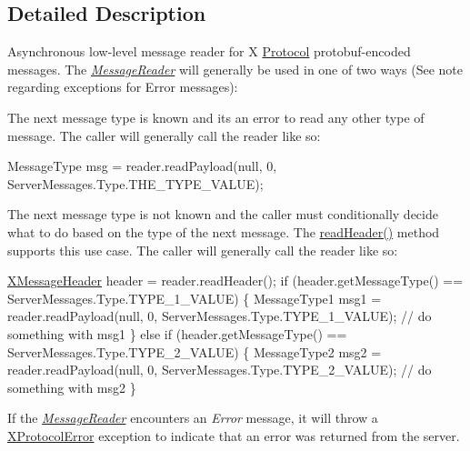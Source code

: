 \subsection{Detailed Description}
Asynchronous low-\/level message reader for X \mbox{\hyperlink{interfacecom_1_1mysql_1_1cj_1_1protocol_1_1_protocol}{Protocol}} protobuf-\/encoded messages. The {\itshape \mbox{\hyperlink{interfacecom_1_1mysql_1_1cj_1_1protocol_1_1_message_reader}{Message\+Reader}}} will generally be used in one of two ways (See note regarding exceptions for Error messages)\+: 
\begin{DoxyItemize}
\item The next message type is known and it\textquotesingle{}s an error to read any other type of message. The caller will generally call the reader like so\+:


\begin{DoxyPre}
MessageType msg = reader.readPayload(null, 0, ServerMessages.Type.THE\_TYPE\_VALUE);
\end{DoxyPre}



\item The next message type is not known and the caller must conditionally decide what to do based on the type of the next message. The \mbox{\hyperlink{classcom_1_1mysql_1_1cj_1_1protocol_1_1x_1_1_async_message_reader_a6c755b53680af84a699114422348db84}{read\+Header()}} method supports this use case. The caller will generally call the reader like so\+:


\begin{DoxyPre}
\mbox{\hyperlink{classcom_1_1mysql_1_1cj_1_1protocol_1_1x_1_1_x_message_header}{XMessageHeader}} header = reader.readHeader();
if (header.getMessageType() == ServerMessages.Type.TYPE\_1\_VALUE) \{
    MessageType1 msg1 = reader.readPayload(null, 0, ServerMessages.Type.TYPE\_1\_VALUE);
    // do something with msg1
\} else if (header.getMessageType() == ServerMessages.Type.TYPE\_2\_VALUE) \{
    MessageType2 msg2 = reader.readPayload(null, 0, ServerMessages.Type.TYPE\_2\_VALUE);
    // do something with msg2
\}
\end{DoxyPre}



\end{DoxyItemize}

If the {\itshape \mbox{\hyperlink{interfacecom_1_1mysql_1_1cj_1_1protocol_1_1_message_reader}{Message\+Reader}}} encounters an {\itshape Error} message, it will throw a \mbox{\hyperlink{classcom_1_1mysql_1_1cj_1_1protocol_1_1x_1_1_x_protocol_error}{X\+Protocol\+Error}} exception to indicate that an error was returned from the server. 

